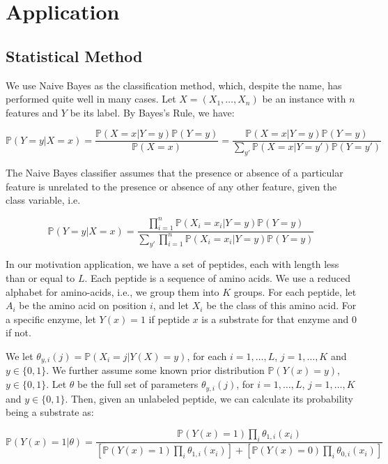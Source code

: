 \documentclass[11pt]{article}
\newcommand{\Prob}{\mathbb{P}}
\begin{document}
\section{Application}
\subsection{Statistical Method}

We use Naive Bayes as the classification method, which, despite the name, has performed quite well in many cases. Let $X=(X_1,\ldots,X_n)$ be an instance with $n$ features and $Y$ be its label. By Bayes's Rule, we have:

\begin{equation*}
\Prob(Y=y|X=x)=\frac{\Prob(X=x|Y=y)\Prob(Y=y)}{\Prob(X=x)}=\frac{\Prob(X=x|Y=y)\Prob(Y=y)}{\sum_{y'}\Prob(X=x|Y=y')\Prob(Y=y')}
\end{equation*}

The Naive Bayes classifier assumes that the presence or absence of a particular feature is unrelated to the presence or absence of any other feature, given the class variable, i.e.

\begin{equation*}
\Prob(Y=y|X=x) = \frac{\prod_{i=1}^n\Prob(X_i=x_i|Y=y)\Prob(Y=y)}{\sum_{y'}\prod_{i=1}^n\Prob(X_i=x_i|Y=y)\Prob(Y=y)}
\end{equation*}

In our motivation application, we have a set of peptides, each with length less than or equal to $L$. Each peptide is a sequence of amino acids. We use a reduced alphabet for amino-acids, i.e., we group them into $K$ groups. For each peptide, let $A_i$ be the amino acid on position $i$, and let $X_i$ be the class of this amino acid. For a specific enzyme, let $Y(x)=1$ if peptide $x$ is a substrate for that enzyme and 0 if not.

We let $\theta_{y,i}(j)=\Prob(X_i=j|Y(X)=y)$, for each $i=1,\ldots,L$, $j=1,\ldots,K$ and $y\in\{0,1\}$. We further assume some known prior distribution $\Prob(Y(x)=y)$, $y\in\{0,1\}$. Let $\theta$ be the full set of parameters $\theta_{y,i}(j)$, for $i=1,\ldots,L$, $j=1,\ldots,K$ and $y\in\{0,1\}$. Then, given an unlabeled peptide, we can calculate its probability being a substrate as:

\begin{equation*} 
  \Prob\left(Y(x) = 1 | \theta\right) =
  \frac{\Prob(Y(x)=1) \prod_{i} \theta_{1,i}(x_i)}{
  \left[ \Prob(Y(x)=1) \prod_{i} \theta_{1,i}(x_i)\right] +
  \left[ \Prob(Y(x)=0) \prod_{i} \theta_{0,i}(x_i)\right]}
\end{equation*}
\end{document}

